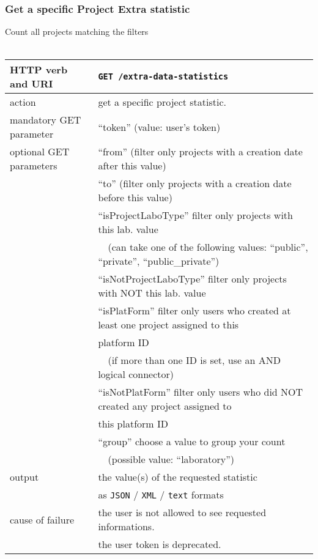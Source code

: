 \subsubsection{Get a specific Project Extra statistic}
\hspace*{\parindent}
Count all projects matching the filters
\\~\\
\begin{tabular}{ | l | l | }
	\hline
	HTTP verb and URI & \texttt{GET /extra-data-statistics} \\
	\hline
	action & get a specific project statistic. \\
	\hline
	mandatory GET parameter & ``token'' (value: user's token) \\
	\hline
	optional GET parameters & ``from'' (filter only projects with a creation date after this value) \\
	\space & ``to'' (filter only projects with a creation date before this value) \\
	\space & ``isProjectLaboType'' filter only projects with this lab. value \\
	\space & ~~(can take one of the following values: ``public'', ``private'', ``public\_private'') \\
	\space & ``isNotProjectLaboType'' filter only projects with NOT this lab. value \\
    \space & ``isPlatForm'' filter only users who created at least one project assigned to this \\
    \space & platform ID \\
	\space & ~~(if more than one ID is set, use an AND logical connector) \\
	\space & ``isNotPlatForm'' filter only users who did NOT created any project assigned to \\
	\space & this platform ID \\
	\space & ``group'' choose a value to group your count \\%
	\space & ~~(possible value: ``laboratory'') \\
	\hline
	output & the value(s) of the requested statistic \\
	\space & as \texttt{JSON} / \texttt{XML} / \texttt{text} formats \\
	\hline
	cause of failure & the user is not allowed to see requested informations. \\
	\space & the user token is deprecated. \\
	\hline
\end{tabular}
\newline

